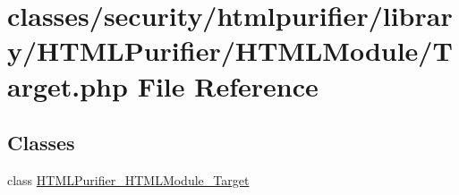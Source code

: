 \hypertarget{Target_8php}{\section{classes/security/htmlpurifier/library/\+H\+T\+M\+L\+Purifier/\+H\+T\+M\+L\+Module/\+Target.php File Reference}
\label{Target_8php}
}
\subsection*{Classes}
\begin{DoxyCompactItemize}
\item 
class \hyperlink{classHTMLPurifier__HTMLModule__Target}{H\+T\+M\+L\+Purifier\+\_\+\+H\+T\+M\+L\+Module\+\_\+\+Target}
\end{DoxyCompactItemize}
